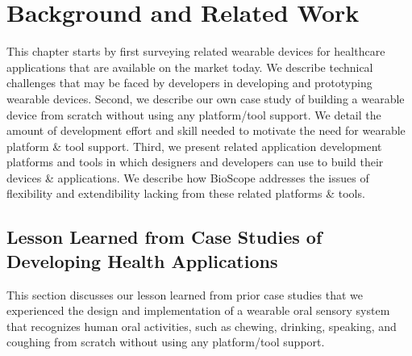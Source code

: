 \chapter{Background and Related Work}
This chapter starts by first surveying related wearable devices for healthcare applications that are available on the market today.
We describe technical challenges that may be faced by developers in developing and prototyping wearable devices.
Second, we describe our own case study of building a wearable device from scratch without using any platform/tool support.
We detail the amount of development effort and skill needed to motivate the need for wearable platform \& tool support.
Third, we present related application development platforms and tools in which designers and developers can use to build their devices \& applications.
We describe how BioScope addresses the issues of flexibility and extendibility lacking from these related platforms \& tools.

\section{Lesson Learned from Case Studies of Developing Health Applications}
This section discusses our lesson learned from prior case studies that we experienced the design and implementation of a wearable oral sensory system that recognizes human oral activities, such as chewing, drinking, speaking, and coughing from scratch without using any platform/tool support. 

